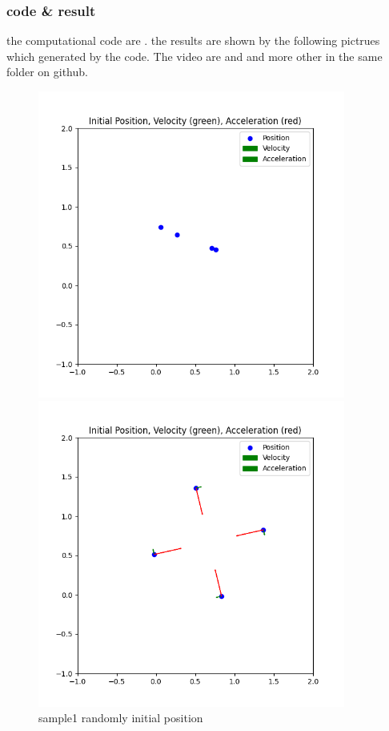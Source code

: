 \documentclass{article}
\theoremstyle{definition} %
\begin{document}
\subsubsection{code \& result}
the computational code are \cite[FourDroneCase]{FourDroneCase} .
the results are shown by the following pictrues which
generated by the code.
The video are \cite[sample1-video]{sample1-video}
and \cite[sample2-video]{sample2-video}
and more other in the same folder on github.
\begin{figure}[ht!]
    \centering
    \begin{minipage}{0.45\textwidth}
        \centering
        \includegraphics[width=0.9\textwidth]{fig/sample1/dd.png} %
        \caption{sample1 randomly initial position}
        \label{fig:fig1}
    \end{minipage}\hfill
    \begin{minipage}{0.45\textwidth}
        \centering
        \includegraphics[width=0.9\textwidth]{fig/sample1/dd_18254.png} %

\end{minipage}
\end{figure}
\end{document}
